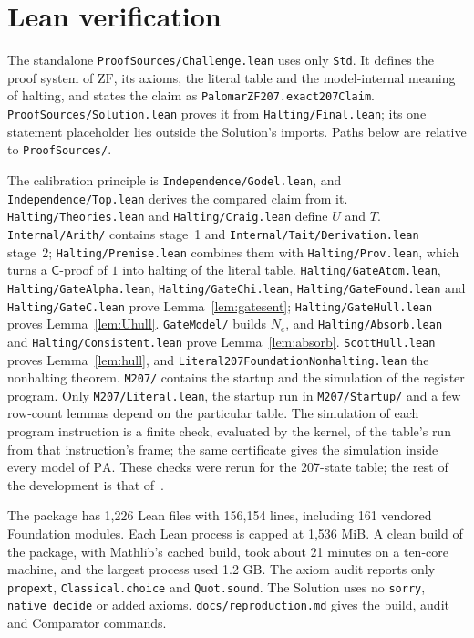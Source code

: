 \documentclass[11pt,letterpaper]{article}
\newcommand{\ZF}{\mathrm{ZF}}
\newcommand{\PA}{\mathrm{PA}}
\newcommand{\Cc}{\mathsf{C}}
\newcommand{\file}[1]{\texttt{\nolinkurl{#1}}}
\begin{document}
\section{Lean verification}\label{sec:status}

The standalone \file{ProofSources/Challenge.lean} uses only \file{Std}.
It defines the proof system of $\ZF$, its axioms, the literal table and the
model-internal meaning of halting, and states the claim as
\file{PalomarZF207.exact207Claim}. \file{ProofSources/Solution.lean} proves
it from \file{Halting/Final.lean}; its one statement placeholder lies
outside the Solution's imports. Paths below are relative to
\file{ProofSources/}.

The calibration principle is \file{Independence/Godel.lean}, and
\file{Independence/Top.lean} derives the compared claim from it.
\file{Halting/Theories.lean} and \file{Halting/Craig.lean} define $U$ and
$T$. \file{Internal/Arith/} contains stage~1 and
\file{Internal/Tait/Derivation.lean} stage~2; \file{Halting/Premise.lean}
combines them with \file{Halting/Prov.lean}, which turns a $\Cc$-proof of
$1$ into halting of the literal table. \file{Halting/GateAtom.lean},
\file{Halting/GateAlpha.lean}, \file{Halting/GateChi.lean},
\file{Halting/GateFound.lean} and \file{Halting/GateC.lean} prove
Lemma~\ref{lem:gatesent}; \file{Halting/GateHull.lean} proves
Lemma~\ref{lem:Uhull}. \file{GateModel/} builds $N_e$, and
\file{Halting/Absorb.lean} and \file{Halting/Consistent.lean} prove
Lemma~\ref{lem:absorb}. \file{ScottHull.lean} proves
Lemma~\ref{lem:hull}, and \file{Literal207FoundationNonhalting.lean} the
nonhalting theorem. \file{M207/} contains the startup and the simulation
of the register program. Only \file{M207/Literal.lean}, the startup run in
\file{M207/Startup/} and a few row-count lemmas depend on the particular
table. The simulation of each program instruction is a finite check,
evaluated by the kernel, of the table's run from that instruction's frame;
the same certificate gives the simulation inside every model of $\PA$.
These checks were rerun for the 207-state table; the rest of the
development is that of~\cite{zf209}.

The package has 1,226 Lean files with 156,154 lines, including 161
vendored Foundation modules. Each Lean process is capped at 1,536 MiB.
A clean build of the package, with Mathlib's cached build, took about
21 minutes on a ten-core machine, and the largest process used 1.2 GB.
The axiom audit reports only \file{propext}, \file{Classical.choice} and
\file{Quot.sound}. The Solution uses no \file{sorry},
\file{native_decide} or added axioms. \file{docs/reproduction.md} gives the
build, audit and Comparator commands.
\end{document}
